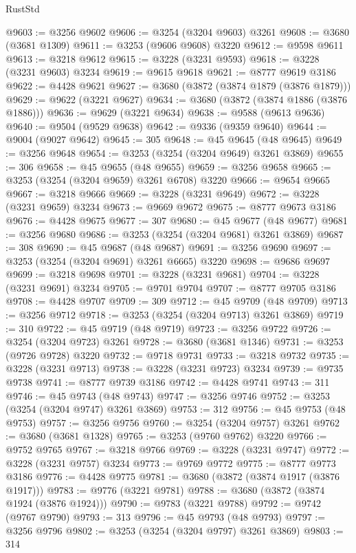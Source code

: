 \begin{lexlean}{RustStd}
\begin{coremodule}
@9603 := @3256 @9602
@9606 := @3254 (@3204 @9603) @3261
@9608 := @3680 (@3681 @1309)
@9611 := @3253 (@9606 @9608) @3220
@9612 := @9598 @9611
@9613 := @3218 @9612
@9615 := @3228 (@3231 @9593)
@9618 := @3228 (@3231 @9603) @3234
@9619 := @9615 @9618
@9621 := @8777 @9619 @3186
@9622 := @4428 @9621
@9627 := @3680 (@3872 (@3874 @1879 (@3876 @1879)))
@9629 := @9622 (@3221 @9627)
@9634 := @3680 (@3872 (@3874 @1886 (@3876 @1886)))
@9636 := @9629 (@3221 @9634)
@9638 := @9588 (@9613 @9636)
@9640 := @9504 (@9529 @9638)
@9642 := @9336 (@9359 @9640)
@9644 := @9004 (@9027 @9642)
@9645 := 305
@9648 := @45 @9645 (@48 @9645)
@9649 := @3256 @9648
@9654 := @3253 (@3254 (@3204 @9649) @3261 @3869)
@9655 := 306
@9658 := @45 @9655 (@48 @9655)
@9659 := @3256 @9658
@9665 := @3253 (@3254 (@3204 @9659) @3261 @6708) @3220
@9666 := @9654 @9665
@9667 := @3218 @9666
@9669 := @3228 (@3231 @9649)
@9672 := @3228 (@3231 @9659) @3234
@9673 := @9669 @9672
@9675 := @8777 @9673 @3186
@9676 := @4428 @9675
@9677 := 307
@9680 := @45 @9677 (@48 @9677)
@9681 := @3256 @9680
@9686 := @3253 (@3254 (@3204 @9681) @3261 @3869)
@9687 := 308
@9690 := @45 @9687 (@48 @9687)
@9691 := @3256 @9690
@9697 := @3253 (@3254 (@3204 @9691) @3261 @6665) @3220
@9698 := @9686 @9697
@9699 := @3218 @9698
@9701 := @3228 (@3231 @9681)
@9704 := @3228 (@3231 @9691) @3234
@9705 := @9701 @9704
@9707 := @8777 @9705 @3186
@9708 := @4428 @9707
@9709 := 309
@9712 := @45 @9709 (@48 @9709)
@9713 := @3256 @9712
@9718 := @3253 (@3254 (@3204 @9713) @3261 @3869)
@9719 := 310
@9722 := @45 @9719 (@48 @9719)
@9723 := @3256 @9722
@9726 := @3254 (@3204 @9723) @3261
@9728 := @3680 (@3681 @1346)
@9731 := @3253 (@9726 @9728) @3220
@9732 := @9718 @9731
@9733 := @3218 @9732
@9735 := @3228 (@3231 @9713)
@9738 := @3228 (@3231 @9723) @3234
@9739 := @9735 @9738
@9741 := @8777 @9739 @3186
@9742 := @4428 @9741
@9743 := 311
@9746 := @45 @9743 (@48 @9743)
@9747 := @3256 @9746
@9752 := @3253 (@3254 (@3204 @9747) @3261 @3869)
@9753 := 312
@9756 := @45 @9753 (@48 @9753)
@9757 := @3256 @9756
@9760 := @3254 (@3204 @9757) @3261
@9762 := @3680 (@3681 @1328)
@9765 := @3253 (@9760 @9762) @3220
@9766 := @9752 @9765
@9767 := @3218 @9766
@9769 := @3228 (@3231 @9747)
@9772 := @3228 (@3231 @9757) @3234
@9773 := @9769 @9772
@9775 := @8777 @9773 @3186
@9776 := @4428 @9775
@9781 := @3680 (@3872 (@3874 @1917 (@3876 @1917)))
@9783 := @9776 (@3221 @9781)
@9788 := @3680 (@3872 (@3874 @1924 (@3876 @1924)))
@9790 := @9783 (@3221 @9788)
@9792 := @9742 (@9767 @9790)
@9793 := 313
@9796 := @45 @9793 (@48 @9793)
@9797 := @3256 @9796
@9802 := @3253 (@3254 (@3204 @9797) @3261 @3869)
@9803 := 314

\end{coremodule}
\end{lexlean}
